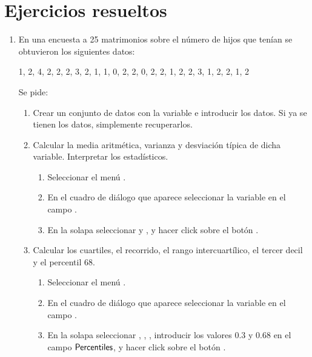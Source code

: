 \section{Ejercicios resueltos}
\begin{enumerate}[leftmargin=*]
\item En una encuesta a 25 matrimonios sobre el número de hijos que tenían se obtuvieron los siguientes datos:
\begin{center}
1, 2, 4, 2, 2, 2, 3, 2, 1, 1, 0, 2, 2, 0, 2, 2, 1, 2, 2, 3, 1, 2, 2, 1, 2
\end{center}
Se pide:
\begin{enumerate}
\item Crear un conjunto de datos con la variable  e introducir los datos. 
Si ya se tienen los datos, simplemente recuperarlos.

\item Calcular la media aritmética, varianza y desviación típica de dicha variable.
Interpretar los estadísticos. 
\begin{indicacion}
\begin{enumerate}
\item Seleccionar el menú .
\item En el cuadro de diálogo que aparece seleccionar la variable  en el campo .
\item En la solapa  seleccionar  y , y hacer
click sobre el botón .
\end{enumerate}
\end{indicacion}

\item Calcular los cuartiles, el recorrido, el rango intercuartílico, el tercer decil y el percentil 68. 
\begin{indicacion}
\begin{enumerate}
\item Seleccionar el menú .
\item En el cuadro de diálogo que aparece seleccionar la variable  en el campo .
\item En la solapa  seleccionar , , , introducir los valores $0.3$ y $0.68$ en el campo $\textsf{Percentiles}$, y hacer click sobre el botón
.
\end{enumerate}
\end{indicacion}
\end{enumerate}


\end{enumerate}
